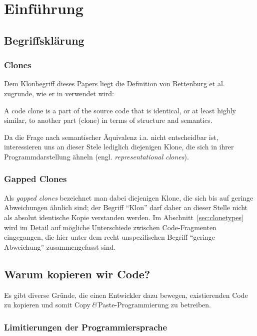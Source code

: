 \section{Einführung}

\subsection{Begriffsklärung}

\subsubsection{Clones}

Dem Klonbegriff dieses Papers liegt die Definition von Bettenburg et al. zugrunde, wie er in \cite{bettenburg2012empirical} verwendet wird:

\begin{italicquotes}
A code clone is a part of the source code that is identical, or at least highly similar, to another part (clone) in terms of structure and semantics.
\end{italicquotes}

Da die Frage nach semantischer Äquivalenz i.a. nicht entscheidbar ist, interessieren uns an dieser Stele lediglich diejenigen Klone, die sich in ihrer Programmdarstellung ähneln (engl. \textit{representational clones}).


\subsubsection{Gapped Clones}

Als \textit{gapped clones} bezeichnet man dabei diejenigen Klone, die sich bis auf geringe Abweichungen ähnlich sind; der Begriff \enquote{Klon} darf daher an dieser Stelle nicht als absolut identische Kopie verstanden werden. Im Abschnitt~\ref{sec:clonetypes} wird im Detail auf mögliche Unterschiede zwischen Code-Fragmenten eingegangen, die hier unter dem recht unspezifischen Begriff \enquote{geringe Abweichung} zusammengefasst sind.


\subsection{Warum kopieren wir Code?}

Es gibt diverse Gründe, die einen Entwickler dazu bewegen, existierenden Code zu kopieren und somit Copy\,\textit{\&}\,Paste-Programmierung zu betreiben.


\subsubsection{Limitierungen der Programmiersprache}

